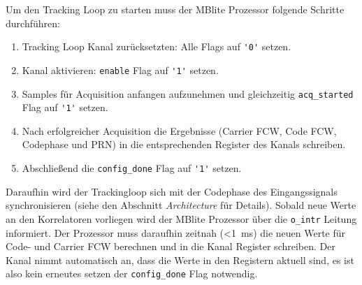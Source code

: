 Um den Tracking Loop zu starten muss der MBlite Prozessor folgende Schritte durchführen:

\begin{enumerate}
    \item Tracking Loop Kanal zurücksetzten: Alle Flags auf \lstinline$'0'$ setzen.
    \item Kanal aktivieren: \lstinline$enable$ Flag auf \lstinline$'1'$ setzen.
    \item Samples für Acquisition anfangen aufzunehmen und gleichzeitig \lstinline$acq_started$ Flag auf \lstinline$'1'$ setzen.
    \item Nach erfolgreicher Acquisition die Ergebnisse (Carrier FCW, Code FCW, Codephase und PRN) in die entsprechenden Register des Kanals schreiben.
    \item Abschließend die \lstinline$config_done$ Flag auf \lstinline$'1'$ setzen.
\end{enumerate}

Daraufhin wird der Trackingloop sich mit der Codephase des Eingangssignals synchronisieren (siehe den Abschnitt \emph{Architecture} für Details). Sobald neue Werte an den Korrelatoren vorliegen wird der MBlite Prozessor über die \lstinline$o_intr$ Leitung informiert. Der Prozessor muss daraufhin zeitnah (\SI{<1}{\milli\second}) die neuen Werte für Code- und Carrier FCW berechnen und in die Kanal Register schreiben. Der Kanal nimmt automatisch an, dass die Werte in den Registern aktuell sind, es ist also kein erneutes setzen der \lstinline$config_done$ Flag notwendig.


